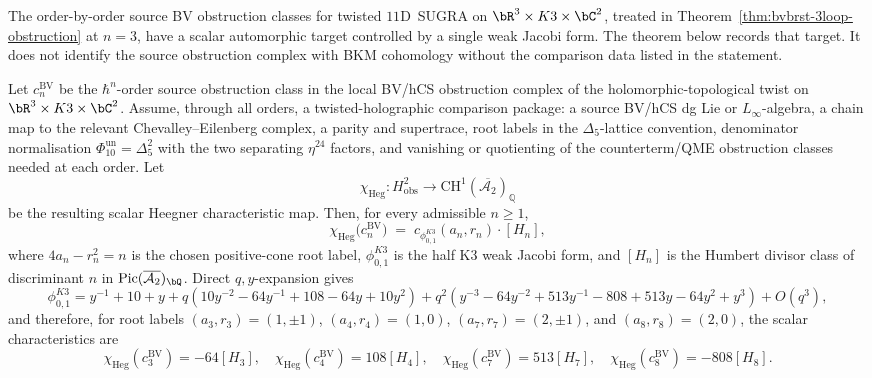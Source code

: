 The order-by-order source BV obstruction classes for twisted
$11$D~SUGRA on $\bR^3\times K3\times\bC^2$, treated in
Theorem~\ref{thm:bvbrst-3loop-obstruction} at \(n=3\), have a scalar
automorphic target controlled by a single weak Jacobi form. The theorem
below records that target. It does not identify the source obstruction
complex with BKM cohomology without the comparison data listed in the
statement.

\begin{theorem}
\label{thm:bvbrst-heegner-all-order-vol2}
Let \(c_n^{\mathrm{BV}}\) be the \(\hbar^n\)-order source obstruction
class in the local BV/hCS obstruction complex of the
holomorphic-topological twist on
\(\bR^3\times K3\times\bC^2\). Assume, through all orders, a
twisted-holographic comparison package: a source BV/hCS dg Lie or
\(L_\infty\)-algebra, a chain map to the relevant Chevalley--Eilenberg
complex, a parity and supertrace, root labels in the
	\(\Delta_5\)-lattice convention, denominator normalisation
	\(\Phi_{10}^{\mathrm{un}}=\Delta_5^2\) with the two separating
	\(\eta^{24}\) factors,
and vanishing or quotienting of the counterterm/QME obstruction classes
needed at each order. Let
\[
 \chi_{\mathrm{Heg}}\colon
 H^2_{\mathrm{obs}}\longrightarrow
 \mathrm{CH}^1(\overline{\mathcal{A}_2})_\mathbb{Q}
\]
be the resulting scalar Heegner characteristic map. Then, for every
admissible \(n\geq1\),
\begin{equation}\label{eq:vol2-bvbrst-heegner-identity}
 \chi_{\mathrm{Heg}}\bigl(c_n^{\mathrm{BV}}\bigr)
 \;=\; c_{\phi_{0,1}^{K3}}(a_n,r_n)\cdot [H_n],
\end{equation}
where \(4a_n-r_n^2=n\) is the chosen positive-cone root label,
\(\phi_{0,1}^{K3}\) is the half K3 weak Jacobi form, and $[H_n]$ is the
Humbert divisor class of discriminant $n$ in
\(\mathrm{Pic}(\overline{\mathcal{A}_2})_\bQ\). Direct \(q,y\)-expansion gives
\[
\phi_{0,1}^{K3}=y^{-1}+10+y
+q(10y^{-2}-64y^{-1}+108-64y+10y^2)
+q^2(y^{-3}-64y^{-2}+513y^{-1}-808+513y-64y^2+y^3)+O(q^3),
\]
and therefore, for root labels \((a_3,r_3)=(1,\pm1)\),
\((a_4,r_4)=(1,0)\), \((a_7,r_7)=(2,\pm1)\), and
\((a_8,r_8)=(2,0)\), the scalar characteristics are
\[
\chi_{\mathrm{Heg}}(c_3^{\mathrm{BV}})=-64[H_3],\quad
\chi_{\mathrm{Heg}}(c_4^{\mathrm{BV}})=108[H_4],\quad
\chi_{\mathrm{Heg}}(c_7^{\mathrm{BV}})=513[H_7],\quad
\chi_{\mathrm{Heg}}(c_8^{\mathrm{BV}})=-808[H_8].
\]
\end{theorem}


